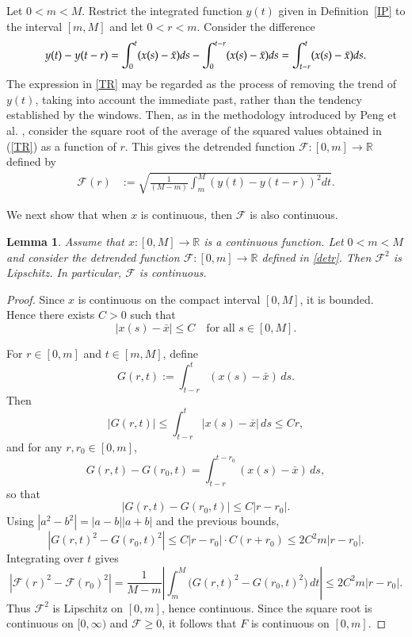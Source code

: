 \documentclass{amsart}
\newtheorem{lemma}[theorem]{Lemma}
\newcommand{\R}{{\mathbb{R}}}
\begin{document}
Let $0<m<M$. Restrict the integrated function $y(t)$ given in Definition~\ref{IP} to the interval $[m,M]$ and let $0<r<m$. Consider the difference
\begin{equation}\label{TR}
     y(t)-y(t-r) = \int_{0}^{t} (x(s)-\Bar{x} ) ds - \int_{0}^{t-r} (x(s)-\Bar{x} ) ds = \int_{t-r}^{t} (x(s)-\Bar{x} ) ds.
\end{equation}
The expression in \eqref{TR} may be regarded as the process of removing the trend of $y(t)$, taking into account the immediate past, rather than the tendency established by the windows. Then, as in the methodology introduced by Peng et al. \cite{Peng}, consider the square root of the average of the squared values obtained in (\ref{TR}) as a function of $r$.  This gives the detrended function $\mathcal{F}\colon [0,m]\to\mathbb R$ defined by
\begin{align}\label{detr}
    \mathcal{F}(r)&:=\sqrt{\frac{1}{(M-m)}\int _{m}^{M} \left(  y(t)-y(t-r) \right)^2  dt}.
\end{align}

We next show that when $x$ is continuous, then $\mathcal F$ is also continuous. 
\begin{lemma}\label{detrendcont}
Assume that $x\colon[0,M]\to\R$ is a continuous function. Let $0<m<M$ and consider the detrended  function $\mathcal{F}\colon[0,m]\to\R$ defined in \eqref{detr}. Then $\mathcal F^2$ is Lipschitz. In particular, $\mathcal F$ is  continuous.
\end{lemma}
\begin{proof}
Since $x$ is continuous on the compact interval $[0,M]$, it is bounded. 
Hence there exists $C>0$ such that
\[
|x(s)-\bar x| \le C
\quad \text{for all } s \in [0,M].
\]

For $r \in [0,m]$ and $t \in [m,M]$, define
\[
G(r,t)
:=
\int_{t-r}^{t} (x(s)-\bar x)\,ds.
\]
Then
\[
|G(r,t)|
\le
\int_{t-r}^{t} |x(s)-\bar x|\,ds
\le
Cr,
\]
and for any $r,r_0 \in [0,m]$,
\[
G(r,t)-G(r_0,t)
=
\int_{t-r}^{t-r_0} (x(s)-\bar x)\,ds,
\]
so that
\[
|G(r,t)-G(r_0,t)|
\le
C|r-r_0|.
\]
Using $|a^2-b^2| = |a-b||a+b|$ and the previous bounds,
\[
|G(r,t)^2 - G(r_0,t)^2|
\le
C|r-r_0| \cdot C(r+r_0)
\le
2C^2 m |r-r_0|.
\]
Integrating over $t$ gives
\[
|\mathcal F(r)^2 - \mathcal F(r_0)^2|
=
\frac{1}{M-m}
\left|
\int_m^M
\big(G(r,t)^2 - G(r_0,t)^2\big)\,dt
\right|
\le
2C^2 m |r-r_0|.
\]
Thus $\mathcal F^2$ is Lipschitz on $[0,m]$, hence continuous. Since the square root is continuous on $[0,\infty)$ and $\mathcal{F} \ge 0$, it follows that $F$ is continuous on $[0,m]$.
\end{proof}
\end{document}

